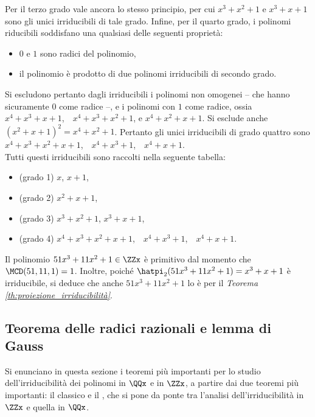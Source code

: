 Per il terzo grado vale ancora lo stesso principio, per cui
$x^3+x^2+1$ e $x^3+x+1$ sono gli unici irriducibili di tale grado.
Infine, per il quarto grado, i polinomi riducibili soddisfano
una qualsiasi delle seguenti proprietà:

\begin{itemize}
    \item $0$ e $1$ sono radici del polinomio,
    \item il polinomio è prodotto di due polinomi irriducibili di
          secondo grado.
\end{itemize}

Si escludono pertanto dagli irriducibili i polinomi non omogenei --
che hanno sicuramente $0$ come radice --, e i polinomi con $1$ come
radice, ossia $x^4+x^3+x+1$,\ \
$x^4+x^3+x^2+1$, e $x^4+x^2+x+1$. Si esclude anche
$(x^2+x+1)^2 = x^4+x^2+1$. Pertanto gli unici irriducibili di
grado quattro sono $x^4+x^3+x^2+x+1$,\ \ $x^4+x^3+1$,\ \  $x^4+x+1$. \\

Tutti questi irriducibili sono raccolti nella seguente tabella:

\begin{itemize}
    \item (grado 1) $x$, $x+1$,
    \item (grado 2) $x^2+x+1$,
    \item (grado 3) $x^3+x^2+1$, $x^3+x+1$,
    \item (grado 4) $x^4+x^3+x^2+x+1$,\ \ $x^4+x^3+1$,\ \ $x^4+x+1$.
\end{itemize}

\begin{example}
    Il polinomio $51x^3+11x^2+1 \in \ZZx$ è primitivo dal momento
    che $\MCD(51, 11, 1)=1$. Inoltre, poiché $\hatpi_2(51x^3+11x^2+1)=
        x^3+x+1$ è irriducibile, si deduce che anche $51x^3+11x^2+1$ lo
    è per il \textit{Teorema \ref{th:proiezione_irriducibilità}}.
\end{example}

\subsection{Teorema delle radici razionali e lemma di Gauss}

Si enunciano in questa sezione i teoremi più importanti per
lo studio dell'irriducibilità dei polinomi in $\QQx$ e
in $\ZZx$, a partire dai due teoremi più importanti: il
classico  e il ,
che si pone da ponte tra l'analisi dell'irriducibilità in $\ZZx$ e
quella in $\QQx$.

